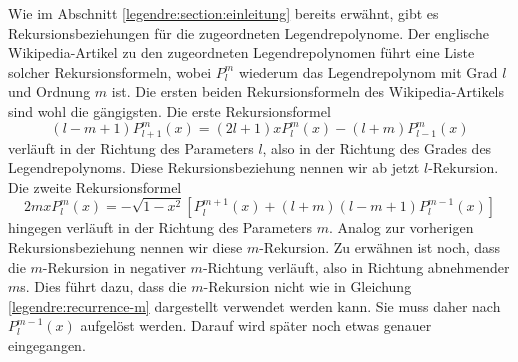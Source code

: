 Wie im Abschnitt \ref{legendre:section:einleitung} bereits erwähnt, gibt es Rekursionsbeziehungen für die zugeordneten Legendrepolynome.
Der englische Wikipedia-Artikel \cite{legendre:wikipedia} zu den zugeordneten Legendrepolynomen führt eine Liste solcher Rekursionsformeln, wobei $P^{m}_{l}$ wiederum das Legendrepolynom mit Grad $l$ und Ordnung $m$ ist.
Die ersten beiden Rekursionsformeln des Wikipedia-Artikels sind wohl die gängigsten.
Die erste Rekursionsformel
\begin{equation}
(l-m+1)P^{m}_{l+1}(x)
=(2l+1)xP^{m}_{l}(x)
-(l+m)P^{m}_{l-1}(x)
\label{legendre:recurrence-l}
\end{equation}
verläuft in der Richtung des Parameters $l$, also in der Richtung des Grades des Legendrepolynoms.
Diese Rekursionsbeziehung nennen wir ab jetzt $l$-Rekursion.
Die zweite Rekursionsformel
\begin{equation}
2mxP^{m}_{l}(x)
=-\sqrt{1-x^2}
\left[ P^{m+1}_{l}(x) + (l+m)(l-m+1)P^{m-1}_{l}(x) \right]
\label{legendre:recurrence-m}
\end{equation}
hingegen verläuft in der Richtung des Parameters $m$.
Analog zur vorherigen Rekursionsbeziehung nennen wir diese $m$-Rekursion.
Zu erwähnen ist noch, dass die $m$-Rekursion in negativer $m$-Richtung verläuft, also in Richtung abnehmender $m$s.
Dies führt dazu, dass die $m$-Rekursion nicht wie in Gleichung \eqref{legendre:recurrence-m} dargestellt verwendet werden kann.
Sie muss daher nach $P^{m-1}_{l}(x)$ aufgelöst werden.
Darauf wird später noch etwas genauer eingegangen.

